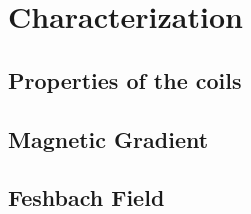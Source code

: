 \section{Characterization}
\subsection*{Properties of the coils}

\subsection*{Magnetic Gradient}

\subsection*{Feshbach Field} 